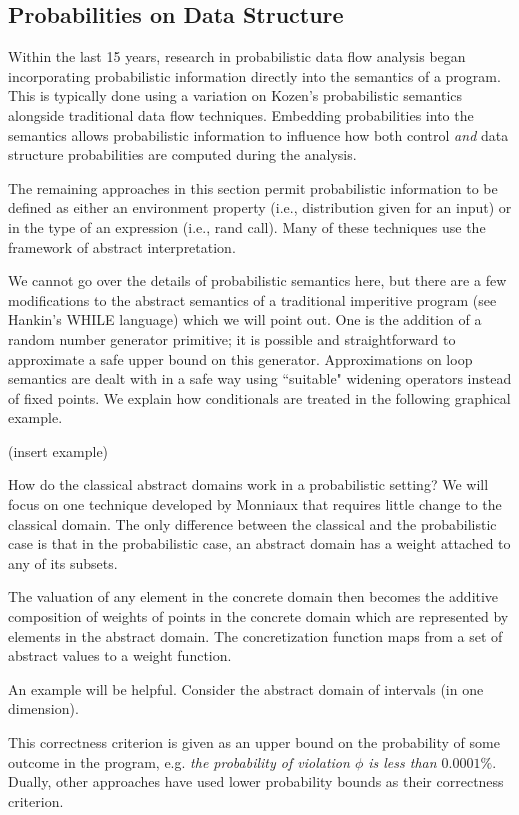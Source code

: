 \subsection{Probabilities on Data Structure}

Within the last 15 years, research in probabilistic data flow analysis
began incorporating probabilistic information directly into
the semantics of a program.
This is typically done using a variation on Kozen's 
probabilistic semantics alongside traditional data
flow techniques.
Embedding probabilities into the semantics allows probabilistic
information to influence how both control {\sl and} data structure
probabilities are computed during the analysis.

The remaining approaches in this section permit probabilistic
information to be defined as either an environment property
(i.e., distribution given for an input) or in the type of
an expression (i.e., rand call).
Many of these techniques use the framework of abstract
interpretation.

We cannot go over the details of probabilistic semantics here, but there
are a few modifications to the abstract semantics of a
traditional imperitive program (see Hankin's WHILE language) 
which we will point out.
One is the addition of a random number generator primitive; it
is possible and straightforward to approximate a safe upper
bound on this generator.
Approximations on loop semantics are dealt with in a safe way
using ``suitable" widening operators instead of fixed points.
We explain how conditionals are treated in the following
graphical example.

(insert example)

How do the classical abstract domains work in a
probabilistic setting?
We will focus on one technique developed by Monniaux
that requires little change to the classical domain.
The only difference between the classical and the probabilistic 
case is that in the probabilistic case, 
an abstract domain has a weight attached to any of its subsets.

The valuation of any element in the concrete domain then 
becomes the additive composition of weights of points in 
the concrete domain which are represented by elements in
the abstract domain.
The concretization function maps from a set of abstract
values to a weight function.

An example will be helpful.
Consider the abstract domain of intervals (in one dimension).

This correctness criterion is given as an upper bound on the
probability of some outcome in the program, e.g. {\sl the
probability of violation $\phi$ is less than $0.0001\%$}.
Dually, other approaches have
used lower probability bounds as their correctness criterion.

